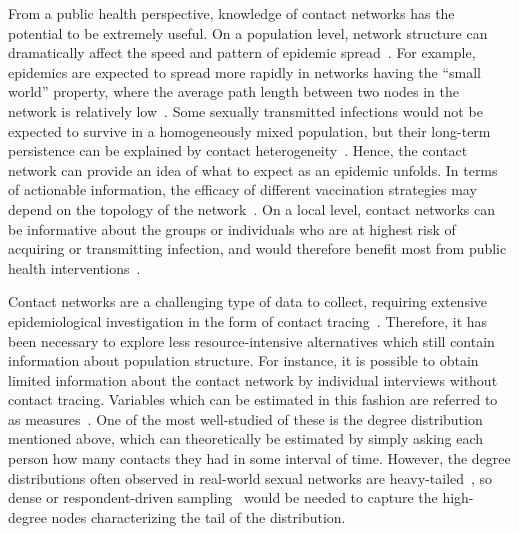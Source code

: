 From a public health perspective, knowledge of contact networks has the
potential to be extremely useful. On a population level, network structure can
dramatically affect the speed and pattern of epidemic
spread~\autocite[\eg][]{barthelemy2005dynamical, volz2008sir}. For example,
epidemics are expected to spread more rapidly in networks having the ``small
world'' property, where the average path length between two nodes in the
network is relatively low~\autocite{watts1998collective}. Some sexually
transmitted infections would not be expected to survive in a homogeneously
mixed population, but their long-term persistence can be explained by contact
heterogeneity~\autocite{anderson1992infectious, pastor2001epidemic}. Hence, the
contact network can provide an idea of what to expect as an epidemic unfolds.
In terms of actionable information, the efficacy of different vaccination
strategies may depend on the topology of the
network~\autocite{keeling2005networks,peng2013vaccination, ma2013importance,
rushmore2014network}. On a local level, contact networks can be informative
about the groups or individuals who are at highest risk of acquiring or
transmitting infection, and would therefore benefit most from public health
interventions~\autocite{wang2015targeting, little2014using}.

Contact networks are a challenging type of data to collect, requiring extensive
epidemiological investigation in the form of contact
tracing~\autocite{morris1993epidemiology, welch2011statistical,
keeling2005networks, eames2015six}. Therefore, it has been necessary to explore
less resource-intensive alternatives which still contain information about
population structure. For instance, it is possible to obtain limited
information about the contact network by individual interviews without contact
tracing. Variables which can be estimated in this fashion are referred to as
 measures~\autocite{wasserman1994social}. One of the most
well-studied of these is the degree distribution mentioned above, which can
theoretically be estimated by simply asking each person how many contacts they
had in some interval of time. However, the degree distributions often observed
in real-world sexual networks are heavy-tailed~\autocite{liljeros2001web,
schneeberger2004scale, colgate1989risk}, so dense or respondent-driven
sampling~\autocite{heckathorn1997respondent} would be needed to capture the
high-degree nodes characterizing the tail of the distribution.


